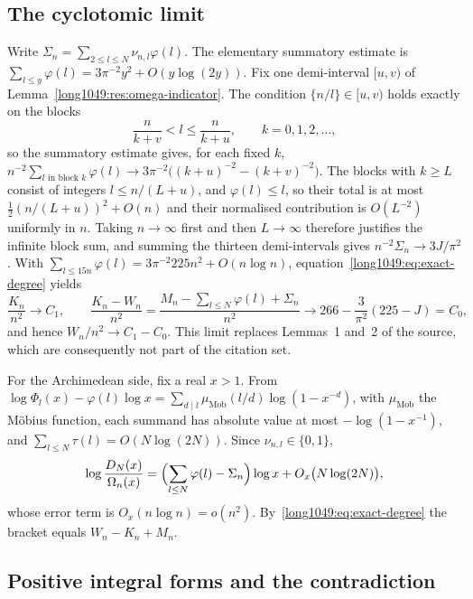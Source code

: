 \subsection{The cyclotomic limit}\label{long1049:sec:cyclotomic-limit}

Write $\Sigma_n=\sum_{2\le l\le N}\nu_{n,l}\varphi(l)$.  The elementary
summatory estimate is $\sum_{l\le y}\varphi(l)=3\pi^{-2}y^{2}+O(y\log(2y))$.
Fix one demi-interval $[u,v)$ of Lemma~\ref{long1049:res:omega-indicator}.  The condition
$\{n/l\}\in[u,v)$ holds exactly on the blocks
\[
 \frac{n}{k+v}<l\le\frac{n}{k+u},\qquad k=0,1,2,\dots,
\]
so the summatory estimate gives, for each fixed $k$,
$n^{-2}\sum_{l\text{ in block }k}\varphi(l)\to3\pi^{-2}\bigl((k+u)^{-2}-(k+v)^{-2}\bigr)$.
The blocks with $k\ge L$ consist of integers $l\le n/(L+u)$, and
$\varphi(l)\le l$, so their total is at most $\tfrac12(n/(L+u))^{2}+O(n)$ and
their normalised contribution is $O(L^{-2})$ uniformly in $n$.  Taking
$n\to\infty$ first and then $L\to\infty$ therefore justifies the infinite block
sum, and summing the thirteen demi-intervals gives
$n^{-2}\Sigma_n\to3J/\pi^{2}$.  With $\sum_{l\le15n}\varphi(l)=3\pi^{-2}225n^{2}+O(n\log n)$,
equation~\eqref{long1049:eq:exact-degree} yields
\begin{equation}\label{long1049:eq:degree-limits}
 \frac{K_n}{n^{2}}\to C_1,
 \qquad
 \frac{K_n-W_n}{n^{2}}=\frac{M_n-\sum_{l\le N}\varphi(l)+\Sigma_n}{n^{2}}
 \to266-\frac{3}{\pi^{2}}(225-J)=C_0,
\end{equation}
and hence $W_n/n^{2}\to C_1-C_0$.  This limit replaces Lemmas~1 and~2 of the
source, which are consequently not part of the citation set.

For the Archimedean side, fix a real $x>1$.  From
$\log\Phi_l(x)-\varphi(l)\log x=\sum_{d\mid l}\mu_{\mathrm{Mob}}(l/d)\log(1-x^{-d})$,
with $\mu_{\mathrm{Mob}}$ the M\"obius function, each summand has absolute value
at most $-\log(1-x^{-1})$, and $\sum_{l\le N}\tau(l)=O(N\log(2N))$.  Since
$\nu_{n,l}\in\{0,1\}$,
\begin{equation}\label{long1049:eq:cyclotomic-size}
 \log\frac{D_N(x)}{\Omega_n(x)}
 =\Bigl(\sum_{l\le N}\varphi(l)-\Sigma_n\Bigr)\log x+O_x\bigl(N\log(2N)\bigr),
\end{equation}
whose error term is $O_x(n\log n)=o(n^{2})$.  By~\eqref{long1049:eq:exact-degree} the
bracket equals $W_n-K_n+M_n$.

\subsection{Positive integral forms and the
contradiction}\label{long1049:sec:integer-forms}

